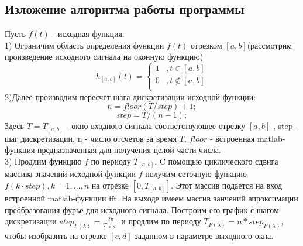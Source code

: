 \documentclass[11pt]{article}
\begin{document}
\subsection{Изложение алгоритма работы программы}
Пусть $f(t)$ - исходная функция.\\
1) Ограничим область определения функции \(f(t)\) отрезком \([a,b]\)(рассмотрим произведение исходного сигнала на оконную функцию)
\[ h_{[a,b]}(t) =
  \begin{cases}
    1 & ,t \in [a,b]\\
    0 & ,t \notin [a,b]\\
  \end{cases}
\]
2)Далее производим пересчет шага дискретизации исходной функции:\\
\[ n = floor(T / step) + 1; \] 
\[ step = T / (n - 1); \]
Здесь \(T = T_{[a,b]}\) - окно входного сигнала соответствующее отрезку \([a,b]\) , step - шаг дискретизации, n - число отсчетов за время \(T\), \(floor\) - встроенная matlab-функция предназначенная для получения целой части числа.\\
3) Продлим функцию \(f\) по периоду \(T_{[a,b]}\). C помощью циклического сдвига массива значений исходной функции \(f\) получим сеточную функцию \(f(k \cdot  step) , k = 1, \dots, n\) на отрезке \([0, T_{[a,b]}]\). Этот массив подается на вход встроенной matlab-функции fft. На выходе имеем массив занчений апроксимации преобразования фурье для исходного сигнала. Построим его график с шагом дискретизации \( step_{F(\lambda)} = \frac{2 \pi}{T_[a,b]}\) и продлим по периоду \(T_{F(\lambda)} = n * step_{F(\lambda)}\), чтобы  изобразить на отрезке \([c,d]\) заданном в параметре выходного окна. 
\end{document}
